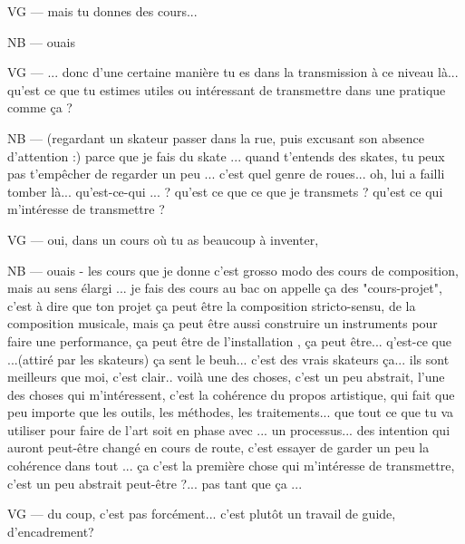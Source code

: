 VG — mais tu donnes des cours...

NB — ouais

VG — ... donc d'une certaine manière tu es dans la transmission à ce niveau là... qu'est ce que tu estimes utiles ou intéressant de transmettre dans une pratique comme ça ?

NB — (regardant un skateur passer dans la rue, puis excusant son absence d'attention :) parce que je fais du skate ... quand t'entends des skates, tu peux pas t'empêcher de regarder un peu ... c'est quel genre de roues... oh, lui a failli tomber là...  qu'est-ce-qui ... ? qu'est ce que ce que je transmets ? qu'est ce qui m'intéresse de transmettre ?

VG — oui, dans un cours où tu as beaucoup à inventer, 

NB —  ouais - les cours que je donne c'est grosso modo des cours de composition, mais au sens élargi ... je fais des cours au bac on appelle ça des "cours-projet", c'est à dire que ton projet ça peut être la composition stricto-sensu, de la composition musicale, mais ça peut être aussi construire un instruments pour faire une performance, ça peut être de l'installation , ça peut être... q'est-ce que ...(attiré par les skateurs) ça sent le beuh... c'est des vrais skateurs ça... ils sont meilleurs que moi, c'est clair.. voilà une des choses, c'est un peu abstrait, l'une des choses qui m'intéressent, c'est la cohérence du propos artistique, qui fait que peu importe que les outils, les méthodes, les traitements... que tout ce que tu va utiliser pour faire de l'art soit en phase avec ... un processus... des intention qui auront peut-être changé en cours de route, c'est essayer de garder un peu la cohérence dans tout ... ça c'est la première chose qui m'intéresse de transmettre, c'est un peu abstrait peut-être ?...  pas tant que ça ...

VG — du coup, c'est pas forcément... c'est plutôt un travail de guide, d'encadrement? 

